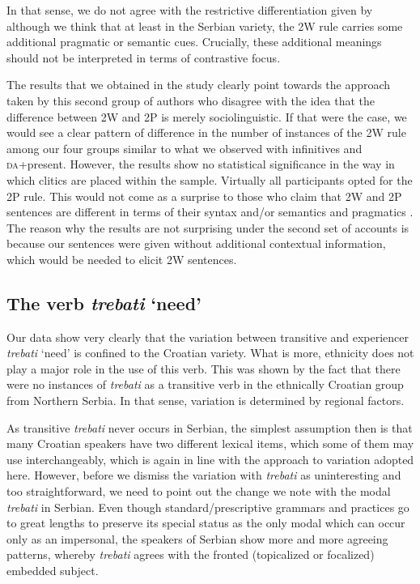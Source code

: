 \documentclass[output=paper,modfonts,newtxmath,hidelinks,]{langscibook}
\begin{document}
\noindent In that sense, we do not agree with the restrictive differentiation given by \citet{DiesingEtAl2009} although we think that at least in the Serbian variety, the 2W rule carries some additional pragmatic or semantic cues. Crucially, these additional meanings should not be interpreted in terms of contrastive focus. 

The results that we obtained in the study clearly point towards the approach taken by this second group of authors who disagree with the idea that the difference between 2W and 2P is merely sociolinguistic. If that were the case, we would see a clear pattern of difference in the number of instances of the 2W rule among our four groups similar to what we observed with infinitives and \textsc{da}+present. However, the results show no statistical significance in the way in which clitics are placed within the sample. Virtually all participants opted for the 2P rule. This would not come as a surprise to those who claim that 2W and 2P sentences are different in terms of their syntax \citep{Boskovic2009} and/or semantics and pragmatics \citep{DiesingEtAl2009}. The reason why the results are not surprising under the second set of accounts is because our sentences were given without additional contextual information, which would be needed to elicit 2W sentences.

\subsection{The verb \textit{trebati} ‘need’}\label{7:s4.3}

Our data show very clearly that the variation between transitive and experiencer \textit{trebati} ‘need’ is confined to the Croatian variety. What is more, ethnicity does not play a major role in the use of this verb. This was shown by the fact that there were no instances of \textit{trebati} as a transitive verb in the ethnically Croatian group from Northern Serbia. In that sense, variation is determined by regional factors.

As transitive \textit{trebati} never occurs in Serbian, the simplest assumption then is that many Croatian speakers have two different lexical items, which some of them may use interchangeably, which is again in line with the approach to variation adopted here. However, before we dismiss the variation with \textit{trebati} as uninteresting and too straightforward, we need to point out the change we note with the modal \textit{trebati} in Serbian. Even though standard/prescriptive grammars and practices go to great lengths to preserve its special status as the only modal which can occur only as an impersonal, the speakers of Serbian  show more and more agreeing patterns, whereby \textit{trebati} agrees with the fronted (topicalized or focalized) embedded subject.
\end{document}
